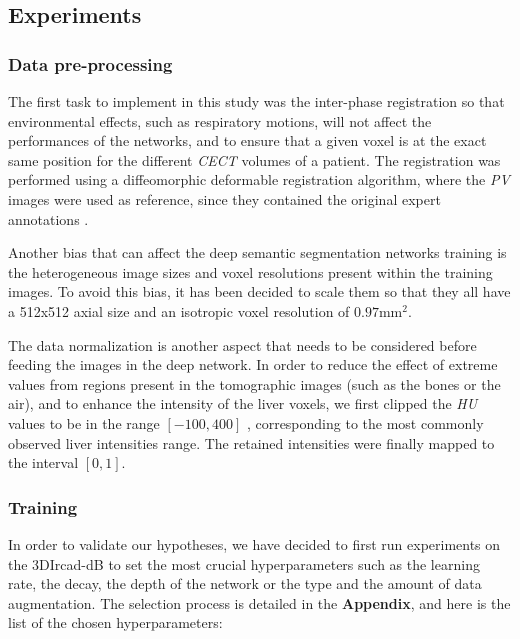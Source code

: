 \documentclass[]{article}
\newcommand{\lmttfont}[1]{{\fontfamily{lmtt}\selectfont #1}}
\begin{document}
	
	
	\subsection*{Experiments}
	
	\subsubsection*{Data pre-processing}
	
	The first task to implement in this study was the inter-phase
	registration so that environmental effects, such as respiratory motions,
	will not affect the performances of the networks, and to ensure that a
	given voxel is at the exact same position for the different \emph{CECT}
	volumes of a patient. The registration was performed using a
	diffeomorphic deformable registration algorithm, where the \emph{PV}
	images were used as reference, since they contained the original expert
	annotations \cite{Avants2008, Conze2017, Ben-Cohen, Christ2017}.
	
	Another bias that can affect the deep semantic segmentation networks
	training is the heterogeneous image sizes and voxel resolutions present
	within the training images.
	To avoid this bias, it has been decided to scale them so that they all
	have a 512x512 axial size and an isotropic voxel resolution of $ 0.97 \text{mm}^2 $.
	
	The data normalization is another aspect that needs to be considered
	before feeding the images in the deep network. In order to reduce the
	effect of extreme values from regions present in the tomographic images
	(such as the bones or the air), and to enhance the intensity of the
	liver voxels, we first clipped the \emph{HU} values to be in the range
	$ \left[-100, 400\right] $ , corresponding to the most commonly observed liver intensities range. The retained intensities were finally mapped to
	the interval $ \left[0, 1\right] $.
	
	\subsubsection*{Training}
	
	In order to validate our hypotheses, we have decided to first run
	experiments on the \lmttfont{3DIrcad-dB} to set the most crucial hyperparameters
	such as the learning rate, the decay, the depth of the network or the
	type and the amount of data augmentation.
	The selection process is detailed in the \textbf{Appendix}, and here is the list of the chosen hyperparameters:
	
\end{document}
